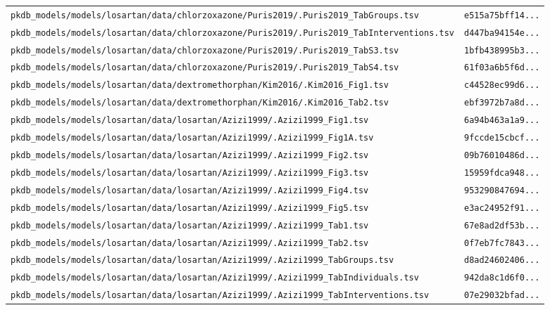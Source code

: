 \begin{longtable}{ll}
\texttt{pkdb\_models/models/losartan/data/chlorzoxazone/Puris2019/.Puris2019\_TabGroups.tsv} & \texttt{e515a75bff14...} \\
\texttt{pkdb\_models/models/losartan/data/chlorzoxazone/Puris2019/.Puris2019\_TabInterventions.tsv} & \texttt{d447ba94154e...} \\
\texttt{pkdb\_models/models/losartan/data/chlorzoxazone/Puris2019/.Puris2019\_TabS3.tsv} & \texttt{1bfb438995b3...} \\
\texttt{pkdb\_models/models/losartan/data/chlorzoxazone/Puris2019/.Puris2019\_TabS4.tsv} & \texttt{61f03a6b5f6d...} \\
\texttt{pkdb\_models/models/losartan/data/dextromethorphan/Kim2016/.Kim2016\_Fig1.tsv} & \texttt{c44528ec99d6...} \\
\texttt{pkdb\_models/models/losartan/data/dextromethorphan/Kim2016/.Kim2016\_Tab2.tsv} & \texttt{ebf3972b7a8d...} \\
\texttt{pkdb\_models/models/losartan/data/losartan/Azizi1999/.Azizi1999\_Fig1.tsv} & \texttt{6a94b463a1a9...} \\
\texttt{pkdb\_models/models/losartan/data/losartan/Azizi1999/.Azizi1999\_Fig1A.tsv} & \texttt{9fccde15cbcf...} \\
\texttt{pkdb\_models/models/losartan/data/losartan/Azizi1999/.Azizi1999\_Fig2.tsv} & \texttt{09b76010486d...} \\
\texttt{pkdb\_models/models/losartan/data/losartan/Azizi1999/.Azizi1999\_Fig3.tsv} & \texttt{15959fdca948...} \\
\texttt{pkdb\_models/models/losartan/data/losartan/Azizi1999/.Azizi1999\_Fig4.tsv} & \texttt{953290847694...} \\
\texttt{pkdb\_models/models/losartan/data/losartan/Azizi1999/.Azizi1999\_Fig5.tsv} & \texttt{e3ac24952f91...} \\
\texttt{pkdb\_models/models/losartan/data/losartan/Azizi1999/.Azizi1999\_Tab1.tsv} & \texttt{67e8ad2df53b...} \\
\texttt{pkdb\_models/models/losartan/data/losartan/Azizi1999/.Azizi1999\_Tab2.tsv} & \texttt{0f7eb7fc7843...} \\
\texttt{pkdb\_models/models/losartan/data/losartan/Azizi1999/.Azizi1999\_TabGroups.tsv} & \texttt{d8ad24602406...} \\
\texttt{pkdb\_models/models/losartan/data/losartan/Azizi1999/.Azizi1999\_TabIndividuals.tsv} & \texttt{942da8c1d6f0...} \\
\texttt{pkdb\_models/models/losartan/data/losartan/Azizi1999/.Azizi1999\_TabInterventions.tsv} & \texttt{07e29032bfad...} \\

\end{longtable}
